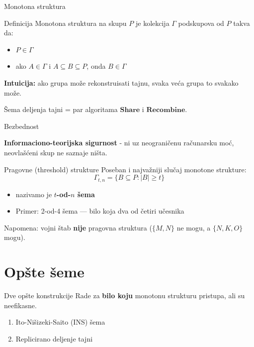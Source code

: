 \documentclass[aspectratio=1610]{beamer}
\begin{document}
\begin{frame}{Monotona struktura}
\begin{block}{Definicija}
Monotona struktura na skupu $P$ je kolekcija $\Gamma$ podskupova od $P$ takva da:
\begin{itemize}
\item $P \in \Gamma$
\item ako $A \in \Gamma$ i $A \subseteq B \subseteq P$, onda $B \in \Gamma$
\end{itemize}
\end{block}
 
\textbf{Intuicija:} ako grupa može rekonstruisati tajnu, svaka veća grupa to svakako može.
 
\vspace{1em}
 
Šema deljenja tajni = par algoritama $\mathbf{Share}$ i $\mathbf{Recombine}$.
\end{frame}
 
\begin{frame}{Bezbednost}
 
\vspace{1em}
\textbf{Informaciono-teorijska sigurnost} - ni uz neograničenu računarsku moć, neovlašćeni skup ne saznaje ništa.
\end{frame}


\begin{frame}{Pragovne (threshold) strukture}
Poseban i najvažniji slučaj monotone strukture:
\[\Gamma_{t,n} = \{ B \subseteq P : |B| \geq t \}\]
 
 
\begin{itemize}
\item nazivamo je \textbf{$t$-od-$n$ šema}
\item Primer: 2-od-4 šema --- bilo koja dva od četiri učesnika
\end{itemize}
 
\vspace{1em}
\alert{Napomena:} vojni štab \textbf{nije} pragovna struktura ($\{M,N\}$ ne mogu, a $\{N,K,O\}$ mogu).
\end{frame}

\section{Opšte šeme}
 
\begin{frame}{Dve opšte konstrukcije}
Rade za \textbf{bilo koju} monotonu strukturu pristupa, ali su neefikasne.
\vspace{1em}
\begin{enumerate}
\item Ito-Nišizeki-Saito (INS) šema
\item Replicirano deljenje tajni
\end{enumerate}
\vspace{1em}
\end{frame}
\end{document}
